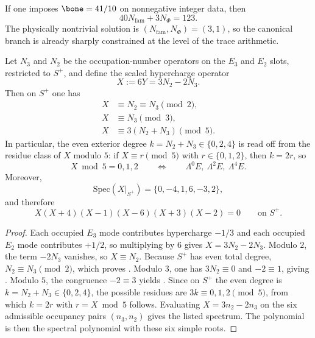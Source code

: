 \begin{remark}
If one imposes $\bone=41/10$ on nonnegative integer data, then
\[
40N_{\mathrm{fam}}+3N_\Phi=123.
\]
The physically nontrivial solution is $(N_{\mathrm{fam}},N_\Phi)=(3,1)$, so the canonical branch is already sharply constrained at the level of the trace arithmetic.
\end{remark}

\begin{proposition}
\label{prop:family-hypercharge-compression}
Let $N_3$ and $N_2$ be the occupation-number operators on the $E_3$ and $E_2$ slots, restricted to $S^+$, and define the scaled hypercharge operator
\[
X:=6Y=3N_2-2N_3.
\]
Then on $S^+$ one has
\begin{align}
X&\equiv N_2\equiv N_3 \pmod 2,\label{eq:x-mod-2}\\
X&\equiv N_3 \pmod 3,\label{eq:x-mod-3}\\
X&\equiv 3(N_2+N_3) \pmod 5.\label{eq:x-mod-5}
\end{align}
In particular, the even exterior degree $k=N_2+N_3\in\{0,2,4\}$ is read off from the residue class of $X$ modulo $5$: if $X\equiv r\pmod 5$ with $r\in\{0,1,2\}$, then $k=2r$, so
\[
X\bmod 5=0,1,2
\qquad\Longleftrightarrow\qquad
\Lambda^0E,\ \Lambda^2E,\ \Lambda^4E.
\]
Moreover,
\[
\mathrm{Spec}(X|_{S^+})=\{0,-4,1,6,-3,2\},
\]
and therefore
\begin{equation}
\label{eq:family-x-polynomial}
X(X+4)(X-1)(X-6)(X+3)(X-2)=0
\qquad\text{on }S^+.
\end{equation}
\end{proposition}

\begin{proof}
Each occupied $E_3$ mode contributes hypercharge $-1/3$ and each occupied $E_2$ mode contributes $+1/2$, so multiplying by $6$ gives $X=3N_2-2N_3$. Modulo $2$, the term $-2N_3$ vanishes, so $X\equiv N_2$. Because $S^+$ has even total degree, $N_2\equiv N_3\pmod 2$, which proves . Modulo $3$, one has $3N_2\equiv 0$ and $-2\equiv 1$, giving . Modulo $5$, the congruence $-2\equiv 3$ yields . Since on $S^+$ the even degree is $k=N_2+N_3\in\{0,2,4\}$, the possible residues are $3k\equiv 0,1,2\pmod 5$, from which $k=2r$ with $r=X\bmod 5$ follows. Evaluating $X=3n_2-2n_3$ on the six admissible occupancy pairs $(n_3,n_2)$ gives the listed spectrum. The polynomial  is then the spectral polynomial with these six simple roots.
\end{proof}


